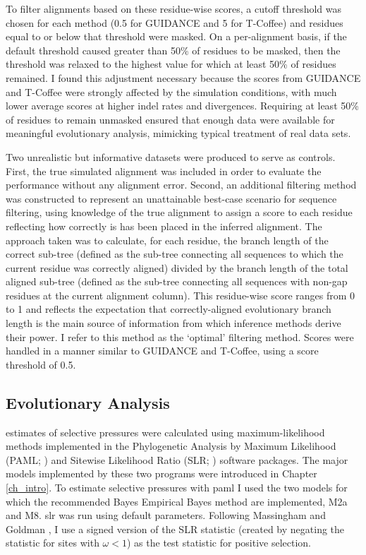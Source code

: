 To filter alignments based on these residue-wise scores, a cutoff
threshold was chosen for each method (0.5 for GUIDANCE and 5 for
T-Coffee) and residues equal to or below that threshold were
masked. On a per-alignment basis, if the default threshold caused
greater than 50\% of residues to be masked, then the threshold was
relaxed to the highest value for which at least 50\% of residues
remained. I found this adjustment necessary because the scores from
GUIDANCE and T-Coffee were strongly affected by the simulation
conditions, with much lower average scores at higher indel rates and
divergences. Requiring at least 50\% of residues to remain unmasked
ensured that enough data were available for meaningful evolutionary
analysis, mimicking typical treatment of real data sets.

Two unrealistic but informative datasets were produced to serve as controls. First,
the true simulated alignment was included in order to evaluate the \sw
performance without any alignment error. Second, an additional
filtering method was constructed to represent an unattainable
best-case scenario for sequence filtering, using knowledge of the true
alignment to assign a score to each residue reflecting how correctly
is has been placed in the inferred alignment. The approach taken was
to calculate, for each residue, the branch length of the correct
sub-tree (defined as the sub-tree connecting all sequences to which
the current residue was correctly aligned) divided by the branch
length of the total aligned sub-tree (defined as the sub-tree
connecting all sequences with non-gap residues at the current
alignment column). This residue-wise score ranges from 0 to 1 and
reflects the expectation that correctly-aligned evolutionary branch
length is the main source of information from which \sw inference
methods derive their power. I refer to this method as the `optimal'
filtering method. Scores were handled in a manner similar to GUIDANCE and
T-Coffee, using a score threshold of 0.5.

\subsection{\Sw Evolutionary Analysis}

\Sw estimates of selective pressures were calculated using
maximum-likelihood methods implemented in the Phylogenetic Analysis by
Maximum Likelihood (PAML; \citealt{Yang2007PAML}) and Sitewise
Likelihood Ratio (SLR; \citealt{Massingham2005}) software
packages. The major models implemented by these two programs were
introduced in Chapter \ref{ch_intro}. To estimate \sw selective
pressures with \ac{paml} I used the two models for which the
recommended Bayes Empirical Bayes method are implemented, M2a and
M8. \ac{slr} was run using default parameters. Following Massingham
and Goldman \citeyearpar{Massingham2005}, I use a signed version of
the SLR statistic (created by negating the statistic for sites with
$\omega<1$) as the test statistic for positive selection.

